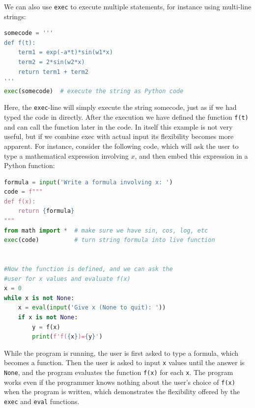 \documentclass[graybox,envcountchap,sectrefs,final]{svmonodo}
\begin{document}
We can also use \texttt{exec} to execute multiple statements, for instance using multi-line strings:
\begin{lstlisting}[language=Python,style=blue1]
somecode = '''
def f(t):
    term1 = exp(-a*t)*sin(w1*x)
    term2 = 2*sin(w2*x)
    return term1 + term2
'''
exec(somecode)  # execute the string as Python code
\end{lstlisting}
Here, the \texttt{exec}-line will simply execute the string somecode, just as if we had typed the code in directly. After the
execution we have defined the function \texttt{f(t)} and can call the function later in the code. In itself this example is
not very useful, but if we combine exec with actual input its flexibility becomes more apparent. For instance, consider the
following code, which will ask the user to type a mathematical expression involving $x$, and then embed this expression in
a Python function:
\begin{lstlisting}[language=Python,style=blue1]
formula = input('Write a formula involving x: ')
code = f"""
def f(x):
    return {formula}
"""
from math import *  # make sure we have sin, cos, log, etc
exec(code)          # turn string formula into live function


#Now the function is defined, and we can ask the
#user for x values and evaluate f(x)
x = 0
while x is not None:
    x = eval(input('Give x (None to quit): '))
    if x is not None:
        y = f(x)
        print(f'f({x})={y}')
\end{lstlisting}
While the program is running, the user is first asked to type a formula, which becomes a function. Then
the user is asked to input \texttt{x} values until the answer is \texttt{None}, and the program evaluates the function
\texttt{f(x)} for each \texttt{x}. The program works even if the programmer knows nothing about the user's choice of \texttt{f(x)}
when the program is written, which demonstrates the flexibility offered by the \texttt{exec} and \texttt{eval} functions.
\end{document}
